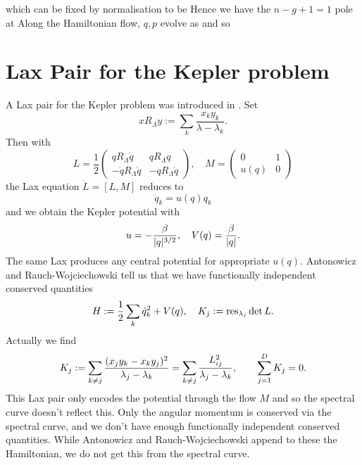 \documentclass{article}
\begin{document}
which can be fixed by normalisation to be 
Hence we have the $n-g+1 =1 $ pole at 
Along the Hamiltonian flow, $q,p$ evolve as 
and so 
\section{Lax Pair for the Kepler problem}

A Lax pair for the Kepler problem was introduced in \cite{MR1196427}. Set
$$ x R_\Lambda y:= \sum_k \frac{x_k y_k}{\lambda-\lambda_k}.$$
Then with
$$L=\frac12 \begin{pmatrix} q R_\Lambda \dot q&  q R_\Lambda  q\\
- \dot q R_\Lambda \dot q&  -q R_\Lambda  \dot q\end{pmatrix},\quad
M=\begin{pmatrix} 0&1\\ u(q)&0\end{pmatrix}
$$
the Lax equation $\dot L =[L,M]$ reduces to
$$\ddot q_k = u(q) q_k$$
and we obtain the Kepler potential with
$$u=-\frac{\beta}{|q|\sp{3/2}}, \quad V(q)=\frac{\beta}{|q|}.$$
The same Lax produces any central potential for appropriate $u(q)$.
Antonowicz and Rauch-Wojciechowski tell us that we have functionally independent conserved quantities
$$H:=\frac12 \sum_k \dot q_k^2 +V(q), \quad
K_j:=\operatorname{res}_{\lambda_j} \det L.
$$
Actually we find
$$K_j:= \sum_{k\ne j} \frac{( x_j y_k-x_k y_j)^2}{ \lambda_j-\lambda_k}
= \sum_{k\ne j} \frac{L_{ij}^2}{ \lambda_j-\lambda_k} ,
\qquad \sum_{j=1}\sp{D} K_j=0.
$$
This Lax pair only encodes the potential through the flow $M$ and so the spectral curve
doesn't reflect this. Only the angular momentum is conserved via the spectral curve, and we don't have enough functionally independent conserved quantities. While Antonowicz and Rauch-Wojciechowski
append to these the Hamiltonian, we do not get this from the spectral curve.



\end{document}

